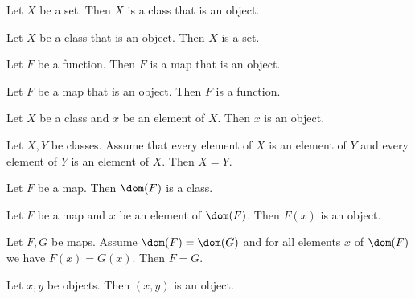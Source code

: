 


\begin{forthel}

  \begin{lemma}
    Let $X$ be a set.
    Then $X$ is a class that is an object.
  \end{lemma}

  \begin{lemma}
    Let $X$ be a class that is an object.
    Then $X$ is a set.
  \end{lemma}



  \begin{lemma}
    Let $F$ be a function.
    Then $F$ is a map that is an object.
  \end{lemma}

  \begin{lemma}
    Let $F$ be a map that is an object.
    Then $F$ is a function.
  \end{lemma}



  \begin{lemma}
    Let $X$ be a class and $x$ be an element of $X$.
    Then $x$ is an object.
  \end{lemma}

  \begin{lemma}
    Let $X, Y$ be classes.
    Assume that every element of $X$ is an element of $Y$ and every element of
    $Y$ is an element of $X$.
    Then $X = Y$.
  \end{lemma}



  \begin{lemma}
    Let $F$ be a map.
    Then $\dom(F)$ is a class.
  \end{lemma}

  \begin{lemma}
    Let $F$ be a map and $x$ be an element of $\dom(F)$.
    Then $F(x)$ is an object.
  \end{lemma}

  \begin{lemma}
    Let $F, G$ be maps.
    Assume $\dom(F) = \dom(G)$ and for all elements $x$ of $\dom(F)$ we have
    $F(x) = G(x)$.
    Then $F = G$.
  \end{lemma}



  \begin{lemma}
    Let $x, y$ be objects.
    Then $(x,y)$ is an object.
  \end{lemma}
\end{forthel}
